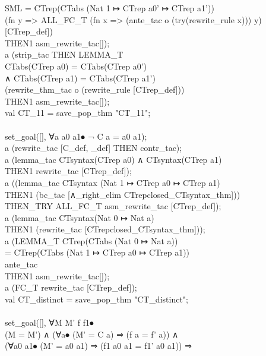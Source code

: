 {\begin{GFT}{SML}
\+             = CTrep(CTabs (Nat 1 ↦ CTrep a0' ↦ CTrep a1'))\PrKO{}\\
\+	(fn y => ALL\_FC\_T (fn x => (ante\_tac o (try(rewrite\_rule x))) y) [CTrep\_def])\\
\+	THEN1 asm\_rewrite\_tac[]);\\
\+a (strip\_tac THEN LEMMA\_T\\
\+	\PrKM{}CTabs(CTrep a0) = CTabs(CTrep a0')\\
\+	∧ CTabs(CTrep a1) = CTabs(CTrep a1')\PrKO{}\\
\+	(rewrite\_thm\_tac o (rewrite\_rule [CTrep\_def]))\\
\+	THEN1 asm\_rewrite\_tac[]);\\
\+val CT\_11 = save\_pop\_thm "CT\_11";\\
\+\\
\+set\_goal([], \PrKM{}∀a a0 a1⦁ ¬ C a = a0  a1\PrKO{});\\
\+a (rewrite\_tac [C\_def, \_def] THEN contr\_tac);\\
\+a (lemma\_tac \PrKM{}CTsyntax(CTrep a0) ∧ CTsyntax(CTrep a1)\PrKO{}\\
\+	THEN1 rewrite\_tac [CTrep\_def]);\\
\+a ((lemma\_tac \PrKM{}CTsyntax (Nat 1 ↦ CTrep a0 ↦ CTrep a1)\PrKO{}\\
\+	THEN1 (bc\_tac [∧\_right\_elim CTrepclosed\_CTsyntax\_thm]))\\
\+		THEN\_TRY ALL\_FC\_T asm\_rewrite\_tac [CTrep\_def]);\\
\+a (lemma\_tac \PrKM{}CTsyntax(Nat 0 ↦ Nat a)\PrKO{}\\
\+	THEN1 (rewrite\_tac [CTrepclosed\_CTsyntax\_thm]));\\
\+a (LEMMA\_T \PrKM{}CTrep(CTabs (Nat 0 ↦ Nat a))\\
\+	= CTrep(CTabs (Nat 1 ↦ CTrep a0 ↦ CTrep a1))\PrKO{}\\
\+	ante\_tac\\
\+	THEN1 asm\_rewrite\_tac[]);\\
\+a (FC\_T rewrite\_tac [CTrep\_def]);\\
\+val CT\_distinct = save\_pop\_thm "CT\_distinct";\\
\+\\
\+set\_goal([], \PrKM{}∀M M' f f1⦁\\
\+         (M = M') ∧ (∀a⦁ (M' = C a) ⇒ (f a = f' a)) ∧\\
\+         (∀a0 a1⦁ (M' = a0  a1) ⇒ (f1 a0 a1 = f1' a0 a1)) ⇒\\

\end{GFT}}
